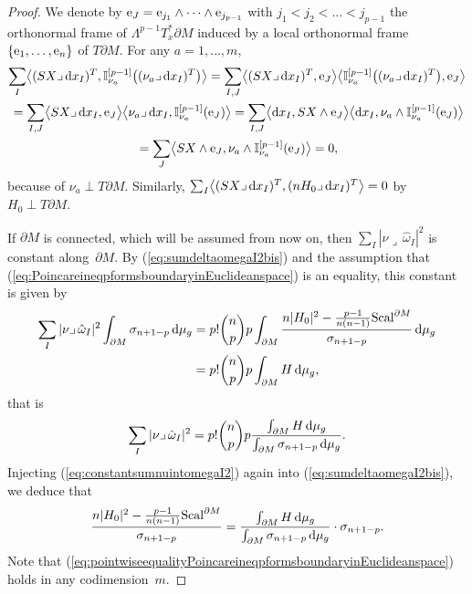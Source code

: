\documentclass[pdftex]{sigma}
\numberwithin{equation}{section}
\begin{document}
\begin{proof}
We denote by ${\rm e}_J={\rm e}_{j_1}\wedge\dots \wedge {\rm e}_{j_{p-1}}$ with $j_1<j_2<\dots<j_{p-1}$ the orthonormal frame of $\Lambda^{p-1}T_x^*\partial M$ induced by a local orthonormal frame $\{{\rm e}_1,\dots,{\rm e}_n\}$ of $T\partial M$.
For any $a=1,\dots,m$,
\begin{gather*}
\sum_I\bigl\langle (SX\lrcorner\,{\rm d}x_I)^T,\mathbb{I}_{\nu_a}^{[p-1]}\bigl((\nu_a\lrcorner\,{\rm d}x_I)^T\bigr)\bigr\rangle=\sum_{I,J}\bigl\langle (SX\lrcorner\,{\rm d}x_I)^T,{\rm e}_J\bigr\rangle \bigl\langle \mathbb{I}_{\nu_a}^{[p-1]}\bigl((\nu_a\lrcorner\,{\rm d}x_I)^T\bigr),{\rm e}_J\bigr\rangle\\
\hphantom{}=\sum_{I,J}\bigl\langle SX\lrcorner\,{\rm d}x_I,{\rm e}_J\bigr\rangle \bigl\langle \nu_a\lrcorner\,{\rm d}x_I,\mathbb{I}_{\nu_a}^{[p-1]}({\rm e}_J)\bigr\rangle
=\sum_{I,J}\bigl\langle {\rm d}x_I,SX\wedge {\rm e}_J\bigr\rangle \bigl\langle {\rm d}x_I,\nu_a\wedge \mathbb{I}_{\nu_a}^{[p-1]}({\rm e}_J)\bigr\rangle\\
\hphantom{}=\sum_{J}\bigl\langle SX\wedge {\rm e}_J,\nu_a\wedge \mathbb{I}_{\nu_a}^{[p-1]}({\rm e}_J)\bigr\rangle
=0,
\end{gather*}
because of $\nu_a\perp T\partial M$.
Similarly, $\sum_I\bigl\langle (SX\lrcorner\,{\rm d}x_I)^T,(nH_0\lrcorner\,{\rm d}x_I)^T\bigr\rangle=0$ by $H_0\perp T\partial M$.


If $\partial M$ is connected, which will be assumed from now on, then $\sum_I|\nu\lrcorner\,\hat{\omega}_I|^2$ is constant along~$\partial M$. By (\ref{eq:sumdeltaomegaI2bis}) and the assumption that (\ref{eq:PoincareineqpformsboundaryinEuclideanspace}) is an equality, this constant is given by
\begin{align*}
\sum_I|\nu\lrcorner\,\hat{\omega}_I|^2\int_{\partial M}\sigma_{n+1-p}\,{\rm d}\mu_g&= p!\binom{n}{p}p\int_{\partial M}\frac{n|H_0|^2-\frac{p-1}{n(n-1)}{\rm Scal}^{\partial M}}{\sigma_{n+1-p}}\,{\rm d}\mu_g\\
&= p!\binom{n}{p}p\int_{\partial M}H\,{\rm d}\mu_g,
\end{align*}
that is
\begin{equation}\label{eq:constantsumnuintomegaI2}
\sum_I|\nu\lrcorner\,\hat{\omega}_I|^2=p!\binom{n}{p}p\frac{\int_{\partial M}H\,{\rm d}\mu_g}{\int_{\partial M}\sigma_{n+1-p}\,{\rm d}\mu_g}.
\end{equation}
Injecting (\ref{eq:constantsumnuintomegaI2}) again  into (\ref{eq:sumdeltaomegaI2bis}), we deduce that
\begin{equation}\label{eq:pointwiseequalityPoincareineqpformsboundaryinEuclideanspace}
\frac{n|H_0|^2-\frac{p-1}{n(n-1)}{\rm Scal}^{\partial M}}{\sigma_{n+1-p}}=\frac{\int_{\partial M}H\,{\rm d}\mu_g}{\int_{\partial M}\sigma_{n+1-p}\,{\rm d}\mu_g}\cdot\sigma_{n+1-p}.
\end{equation}
Note that (\ref{eq:pointwiseequalityPoincareineqpformsboundaryinEuclideanspace}) holds in any codimension~$m$.


\end{proof}
\end{document}
